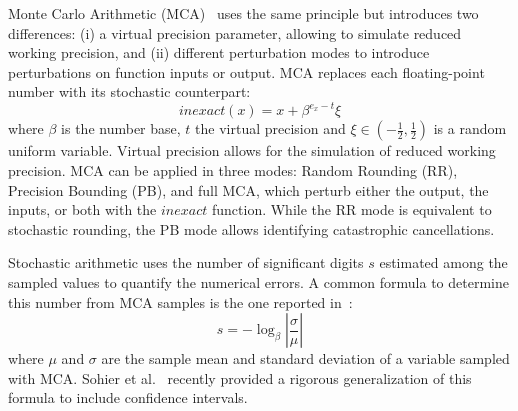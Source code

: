 \documentclass[11pt]{article}
\newcommand{\tristan}[1]{\color{orange}\textbf{From Tristan:} #1\color{black}\xspace}
\begin{document}
Monte Carlo Arithmetic (MCA)~\cite{parker1997monte} uses the same principle but introduces two differences:
(i) a virtual precision parameter, allowing to simulate reduced working precision,  and (ii) different perturbation modes to introduce perturbations
on function inputs or output.
MCA replaces each floating-point number with its stochastic counterpart:
\[
inexact(x) =  x + \beta^{e_x - t}\xi
\]
where $\beta$ is the number base, $t$ the virtual precision and $\xi \in (-\frac{1}{2},\frac{1}{2})$ is a random uniform variable.
Virtual precision allows for the simulation of reduced working precision.
MCA can be applied in three modes: Random Rounding (RR), Precision Bounding (PB), and full MCA, which perturb either the output, the inputs, or both with the $inexact$ function. While the RR mode is equivalent to stochastic rounding, the PB mode allows identifying catastrophic cancellations.

Stochastic arithmetic uses the number of significant digits $s$ estimated among the sampled values to quantify the numerical errors.
A common formula to determine this number from MCA samples is the one reported in~\cite{parker1997monte}:
\begin{equation}
s = -\log_{\beta}{ \left| \dfrac{\sigma}{\mu} \right|} \label{eq:sig-digits}
\end{equation}
where $\mu$ and $\sigma$ are the sample mean and standard deviation of a variable sampled with MCA.  
Sohier et al.~\cite{sohier2018confidence} recently provided a rigorous generalization of this formula to include confidence intervals.

\end{document}
